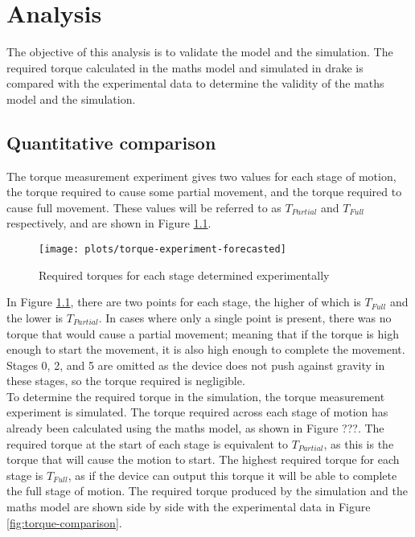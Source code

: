 \chapter{Analysis}

The objective of this analysis is to validate the model and the simulation. The required torque calculated in the maths model and simulated in drake is compared with the experimental data to determine the validity of the maths model and the simulation.

\section{Quantitative comparison}

The torque measurement experiment gives two values for each stage of motion, the torque required to cause some partial movement, and the torque required to cause full movement. These values will be referred to as $T_{Partial}$ and $T_{Full}$ respectively, and are shown in Figure \ref{fig:torque-experiment}.\\

\begin{figure}[!h]
	\centering
	\texttt{[image: plots/torque-experiment-forecasted]}
	\caption{Required torques for each stage determined experimentally}
	\label{fig:torque-experiment}
\end{figure}

In Figure \ref{fig:torque-experiment}, there are two points for each stage, the higher of which is $T_{Full}$ and the lower is $T_{Partial}$. In cases where only a single point is present, there was no torque that would cause a partial movement; meaning that if the torque is high enough to start the movement, it is also high enough to complete the movement. Stages 0, 2, and 5 are omitted as the device does not push against gravity in these stages, so the torque required is negligible.\\

To determine the required torque in the simulation, the torque measurement experiment is simulated. The torque required across each stage of motion has already been calculated using the maths model, as shown in Figure ???. The required torque at the start of each stage is equivalent to $T_{Partial}$, as this is the torque that will cause the motion to start. The highest required torque for each stage is $T_{Full}$, as if the device can output this torque it will be able to complete the full stage of motion. The required torque produced by the simulation and the maths model are shown side by side with the experimental data in Figure \ref{fig:torque-comparison}.\\

